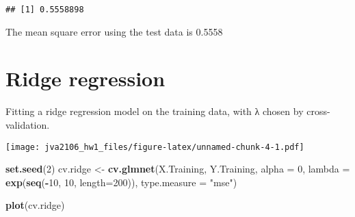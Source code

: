 \documentclass[]{article}
\newenvironment{Shaded}{\begin{snugshade}}{\end{snugshade}}
\newcommand{\KeywordTok}[1]{\textcolor[rgb]{0.13,0.29,0.53}{\textbf{#1}}}
\newcommand{\DataTypeTok}[1]{\textcolor[rgb]{0.13,0.29,0.53}{#1}}
\newcommand{\DecValTok}[1]{\textcolor[rgb]{0.00,0.00,0.81}{#1}}
\newcommand{\StringTok}[1]{\textcolor[rgb]{0.31,0.60,0.02}{#1}}
\newcommand{\OperatorTok}[1]{\textcolor[rgb]{0.81,0.36,0.00}{\textbf{#1}}}
\newcommand{\NormalTok}[1]{#1}
\begin{document}
\begin{verbatim}
## [1] 0.5558898
\end{verbatim}

The mean square error using the test data is 0.5558

\section{Ridge regression}\label{ridge-regression}

Fitting a ridge regression model on the training data, with λ chosen by
cross-validation.

\begin{Shaded}
\end{Shaded}

\texttt{[image: jva2106\_hw1\_files/figure-latex/unnamed-chunk-4-1.pdf]}

\begin{Shaded}
\begin{Highlighting}[]
\KeywordTok{set.seed}\NormalTok{(}\DecValTok{2}\NormalTok{)}
\NormalTok{cv.ridge <-}\StringTok{ }\KeywordTok{cv.glmnet}\NormalTok{(X.Training, Y.Training, }
                      \DataTypeTok{alpha =} \DecValTok{0}\NormalTok{, }
                      \DataTypeTok{lambda =} \KeywordTok{exp}\NormalTok{(}\KeywordTok{seq}\NormalTok{(}\OperatorTok{-}\DecValTok{10}\NormalTok{, }\DecValTok{10}\NormalTok{, }\DataTypeTok{length=}\DecValTok{200}\NormalTok{)),}
                      \DataTypeTok{type.measure =} \StringTok{"mse"}\NormalTok{)}

\KeywordTok{plot}\NormalTok{(cv.ridge)}
\end{Highlighting}
\end{Shaded}
\end{document}
